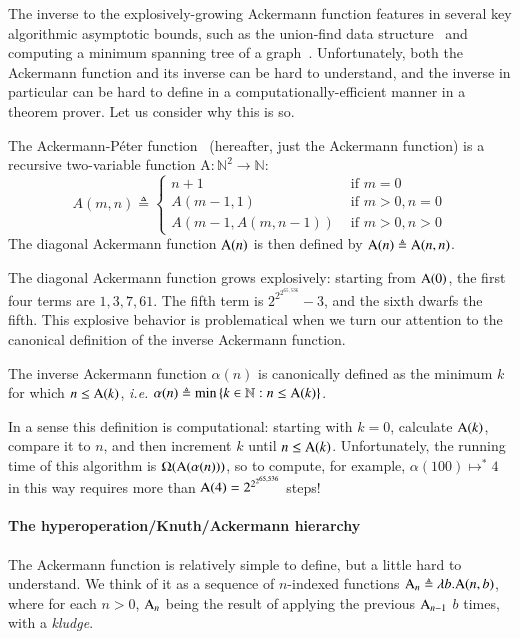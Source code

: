 The inverse to the
explosively-growing Ackermann function features in several key algorithmic asymptotic
bounds, such as the union-find data structure~\cite{tarjan} and computing a minimum spanning 
tree of a graph~\cite{chazelle}.  Unfortunately, both the Ackermann function and its inverse 
can be hard to understand, and the inverse in particular can be hard to define in a computationally-efficient manner in a theorem prover.  Let us consider why this
is so.
\begin{defn} \label{defn: ack}
The Ackermann-P\'eter function~\cite{blah} (hereafter, just the Ackermann function) is a recursive two-variable
function $\text{A} : \mathbb{N}^2 \to \mathbb{N}$:
\begin{equation}
A(m, n) \triangleq \begin{cases}
n + 1 & \text{ if } m = 0 \\
A(m-1, 1) & \text{ if } m > 0, n = 0 \\
A(m-1, A(m, n-1)) & \text{ if } m > 0, n > 0
\end{cases}
\end{equation}
The diagonal Ackermann function $\text{A}(n)$ is then defined by $\text{A}(n) \triangleq \text{A}(n, n)$.
\end{defn}
The diagonal Ackermann function grows explosively: starting from $\text{A}(0)$, the first four terms are $1, 3, 7, 61$.  The fifth term is $2^{2^{2^{65,536}}} - 3$, and the sixth dwarfs the fifth.
This explosive behavior is problematical when we turn our attention to the canonical definition of 
the inverse Ackermann function\cite{blah}.
\begin{defn} \label{defn: inv_ack}
The inverse Ackermann function $\alpha(n)$ is canonically defined as the minimum $k$ for which $n \le \text{A}(k)$, \emph{i.e.} $\alpha(n) \triangleq \min\left\{k\in \mathbb{N} : n \le \text{A}(k)\right\}$.
\end{defn}
In a sense this definition is computational: starting with $k=0$, calculate $\text{A}(k)$, compare
it to $n$, and then increment $k$ until $n \le \text{A}(k)$.  Unfortunately, the running time of this algorithm is $\Omega(\text{A}(\alpha(n)))$, so to compute, for example, $\alpha(100) \mapsto^{*} 4$ in this way requires more than $\text{A}(4) = 2^{2^{2^{65,536}}}$ steps!

\paragraph{The hyperoperation/Knuth/Ackermann hierarchy}

The Ackermann function is relatively simple to define, but a little hard to understand.  We think of it as a sequence of $n$-indexed functions $\text{A}_n \triangleq \lambda b.\text{A}(n,b)$, where for each $n>0$, $\text{A}_n$ being the result of applying the previous $\text{A}_{n-1}$ $b$ times, with a \emph{kludge}.

